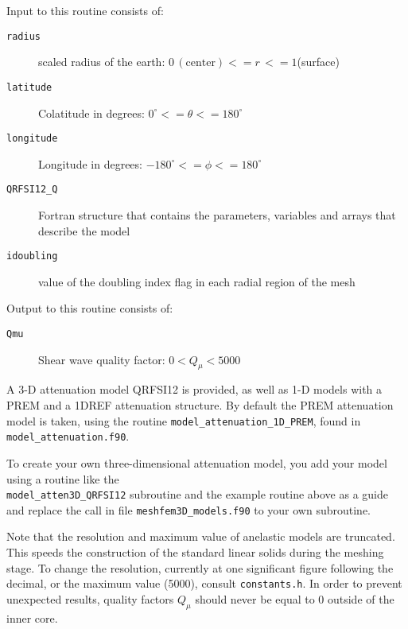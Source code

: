 \noindent
Input to this routine consists of:
\begin{description}
\item [{\texttt{radius}}] scaled radius of the earth: $0\,(\mathrm{center})<=r\,<=1$(surface)
\item [{\texttt{latitude}}] Colatitude in degrees: $0^{\circ}<=\theta<=180^{\circ}$
\item [{\texttt{longitude}}] Longitude in degrees: $-180^{\circ}<=\phi<=180^{\circ}$
\item [{\texttt{QRFSI12\_Q}}] Fortran structure that contains the parameters,
variables and arrays that describe the model
\item [{\texttt{idoubling}}] value of the doubling index flag in each radial region of the mesh
\end{description}
%
Output to this routine consists of:
\begin{description}
\item [{\texttt{Qmu}}] Shear wave quality factor: $0<Q_{\mu}<5000$
\end{description}
A 3-D attenuation model QRFSI12 \citep{DaEkDz08}
is provided, as well as 1-D models with a PREM and a 1DREF
attenuation structure. By default the PREM attenuation model is taken,
using the routine \texttt{model\_attenuation\_1D\_PREM},
found in \texttt{model\_attenuation.f90}.\newline


To create your own three-dimensional attenuation model, you add your model
using a routine like the ~\\
\texttt{model\_atten3D\_QRFSI12} subroutine
and the example routine above as a guide and replace the call in file
\texttt{meshfem3D\_models.f90} to your own subroutine.\newline


Note that the resolution and maximum value of anelastic models are
truncated. This speeds the construction of the standard linear solids
during the meshing stage. To change the resolution, currently at one
significant figure following the decimal, or the maximum value (5000),
consult \texttt{constants.h}. In order to prevent unexpected results,
quality factors $Q_{\mu}$ should never be equal to 0 outside of the
inner core.



